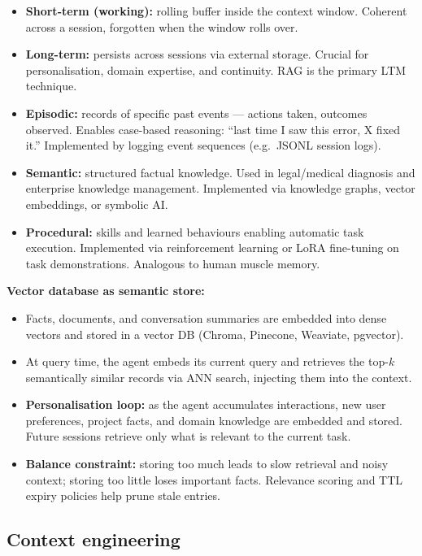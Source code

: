 \begin{itemize}
  \item \textbf{Short-term (working):} rolling buffer inside the context window.
    Coherent across a session, forgotten when the window rolls over.
  \item \textbf{Long-term:} persists across sessions via external storage. Crucial for
    personalisation, domain expertise, and continuity. RAG is the primary LTM technique.
  \item \textbf{Episodic:} records of specific past events — actions taken, outcomes
    observed. Enables case-based reasoning: ``last time I saw this error, X fixed it.''
    Implemented by logging event sequences (e.g.\ JSONL session logs).
  \item \textbf{Semantic:} structured factual knowledge. Used in legal/medical diagnosis
    and enterprise knowledge management. Implemented via knowledge graphs,
    vector embeddings, or symbolic AI.
  \item \textbf{Procedural:} skills and learned behaviours enabling automatic task
    execution. Implemented via reinforcement learning or LoRA fine-tuning on task
    demonstrations. Analogous to human muscle memory.
\end{itemize}

\textbf{Vector database as semantic store:}
\begin{itemize}
  \item Facts, documents, and conversation summaries are embedded into dense vectors
    and stored in a vector DB (Chroma, Pinecone, Weaviate, pgvector).
  \item At query time, the agent embeds its current query and retrieves the top-$k$
    semantically similar records via ANN search, injecting them into the context.
  \item \textbf{Personalisation loop:} as the agent accumulates interactions, new
    user preferences, project facts, and domain knowledge are embedded and stored.
    Future sessions retrieve only what is relevant to the current task.
  \item \textbf{Balance constraint:} storing too much leads to slow retrieval and
    noisy context; storing too little loses important facts. Relevance scoring and
    TTL expiry policies help prune stale entries.
\end{itemize}

\subsection{Context engineering}

